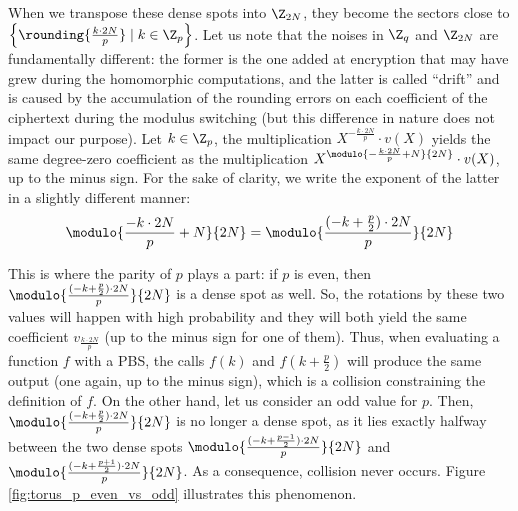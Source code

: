 When we transpose these dense spots into $\Z_{2N}$, they become the sectors close to $\left \{ \rounding{\frac{k \cdot 2N}{p}} \mid k \in \Z_p \right \}$. Let us note that the noises in $\Z_q$ and $\Z_{2N}$ are fundamentally different: the former is the one added at encryption that may have grew during the homomorphic computations, and the latter is called ``drift'' and is caused by the accumulation of the rounding errors on each coefficient of the ciphertext during the modulus switching (but this difference in nature does not impact our purpose). 
Let $k \in \Z_p$, the multiplication $X^{- \frac{k \cdot 2N}{p}} \cdot v(X)$ yields the same degree-zero coefficient as the multiplication  $X^{\modulo{- \frac{k \cdot 2N}{p} + N}{2N}} \cdot v(X)$, up to the minus sign. For the sake of clarity, we write the exponent of the latter in a slightly different manner: 
\[\modulo{
    \frac{
        -k \cdot 2N
        }
    {
        p
    }
    + N
}{2N} = 
\modulo{
    \frac{
    (-k + \frac p 2 ) \cdot 2N
    }
    {p}
}
{2N}\]


This is where the parity of $p$ plays a part: if $p$ is even, then $\modulo{
    \frac{
    (-k + \frac p 2 ) \cdot 2N
    }
    {p}
}
{2N}$ is a dense spot as well. So, the rotations by these two values will happen with high probability and they will both yield the same coefficient $v_{\frac{k \cdot 2N}{p}}$ (up to the minus sign for one of them). Thus, when evaluating a function $f$ with a PBS, the calls $f(k)$ and $f(k + \frac p 2)$ will produce the same output (one again, up to the minus sign), which is a collision constraining the definition of $f$. On the other hand, let us consider an odd value for $p$. Then, $\modulo{
    \frac{
    (-k + \frac p 2 ) \cdot 2N
    }
    {p}
}{2N}$ is no longer a dense spot, as it lies exactly halfway between the two dense spots $\modulo{
    \frac{
    (-k + \frac {p-1} {2} ) \cdot 2N
    }
    {p}
}{2N}$ and $\modulo{
    \frac{
    (-k + \frac {p+1} {2} ) \cdot 2N
    }
    {p}
}{2N}$. As a consequence, collision never occurs. Figure \ref{fig:torus_p_even_vs_odd} illustrates this phenomenon.


